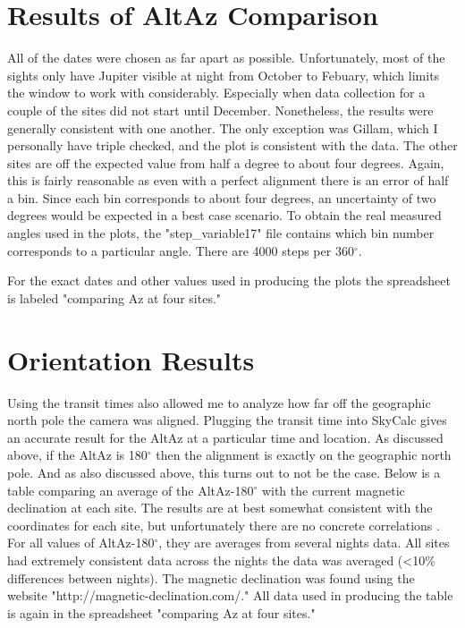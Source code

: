 \documentclass[11pt]{article}
\begin{document}
\vspace{10mm}

\section{Results of AltAz Comparison}
\hspace{0.5cm}

All of the dates were chosen as far apart as possible. Unfortunately, most of the sights only have Jupiter visible at night from October to Febuary, which limits the window to work with considerably. Especially when data collection for a couple of the sites did not start until December. Nonetheless, the results were generally consistent with one another. The only exception was Gillam, which I personally have triple checked, and the plot is consistent with the data. The other sites are off the expected value from half a degree to about four degrees. Again, this is fairly reasonable as even with a perfect alignment there is an error of half a bin. Since each bin corresponds to about four degrees, an uncertainty of two degrees would be expected in a best case scenario. To obtain the real measured angles used in the plots, the "step\_variable17" file contains which bin number corresponds to a particular angle. There are 4000 steps per 360$^\circ$.

For the exact dates and other values used in producing the plots the spreadsheet is labeled "comparing Az at four sites." 

\section{Orientation Results}

Using the transit times also allowed me to analyze how far off the geographic north pole the camera was aligned. Plugging the transit time into SkyCalc gives an accurate result for the AltAz at a particular time and location. As discussed above, if the AltAz is 180$^\circ$ then the alignment is exactly on the geographic north pole. And as also discussed above, this turns out to not be the case. Below is a table comparing an average of the AltAz-180$^\circ$ with the current magnetic declination at each site. The results are at best somewhat consistent with the coordinates for each site, but unfortunately there are no concrete correlations . For all values of AltAz-180$^\circ$, they are averages from several nights data. All sites had extremely consistent data across the nights the data was averaged (\textless10\% differences between nights). The magnetic declination was found using the website "http://magnetic-declination.com/." All data used in producing the table is again in the spreadsheet "comparing Az at four sites."
\end{document}
